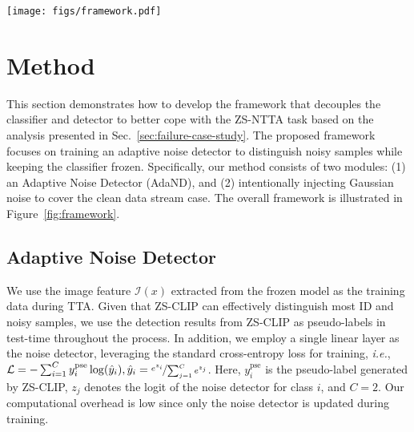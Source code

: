 \begin{figure*}[!t]
\begin{center}
\texttt{[image: figs/framework.pdf]}
\end{center}
  \vspace{-.1in}\caption{Overview of the proposed framework. We use the detection results from ZS-CLIP as pseudo-labels to train the Adaptive Noise Detector (AdaND). In the early stage, we directly use the ZS-CLIP to distinguish clean-noise samples, while in the later stage, we use the AdaND instead. The predicted clean samples are then classified based on the text-based classifier.
   To further handle the clean data stream case, we intentionally inject Gaussian noise as additional noisy samples to avoid wrongly assigning too many clean samples as noisy ones.
}
  \label{fig:framework}
  \vspace{-15pt}
\end{figure*}

\vspace{-.1in}
\section{Method}\label{sec:method}
This section demonstrates how to develop the framework that decouples the classifier and detector to better cope with the ZS-NTTA task based on the analysis presented in Sec.~\ref{sec:failure-case-study}. The proposed framework focuses on training an adaptive noise detector to distinguish noisy samples while keeping the classifier frozen.
Speciﬁcally, our method consists of two modules: (1) an Adaptive Noise Detector (AdaND), 
and (2) intentionally injecting Gaussian noise to cover the clean data stream case. The overall framework is illustrated in Figure~\ref{fig:framework}.

\subsection{Adaptive Noise Detector}
\vspace{-5pt}
We use the image feature $\mathcal{I}(x)$ extracted from the frozen model as the training data during TTA. 
Given that ZS-CLIP can effectively distinguish most ID and noisy samples, we use the detection results from ZS-CLIP as pseudo-labels in test-time throughout the process.
In addition, we employ a single linear layer as the noise detector, leveraging the standard cross-entropy loss for training, \textit{i.e.}, $\mathcal{L} = -\sum_{i=1}^C y_i^\text{pse} \log(\hat{y}_i), \hat{y}_i=\nicefrac{e^{z_i}}{\sum_{j=1}^C e^{z_j}}$. Here, $y_i^\text{pse}$ is the pseudo-label generated by ZS-CLIP, $z_j$ denotes the logit of the noise detector for class $i$, and $C=2$.
Our computational overhead is low since only the noise detector is updated during training. 

